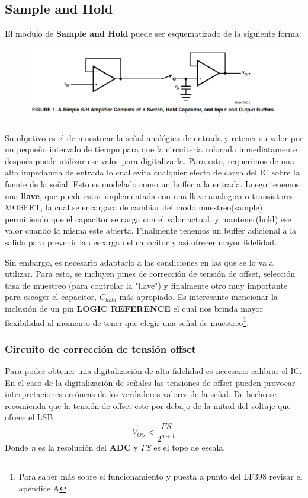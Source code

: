 


\subsection{Sample and Hold}

El modulo de \textbf{Sample and Hold}  puede ser esquematizado de la siguiente forma:

\begin{figure}[H]
	\centering
	\includegraphics[width=0.7\linewidth]{ImagenesEjercicio4/SyH}
	\caption{}
	\label{fig:syh}
\end{figure}
Su objetivo es el de muestrear la señal analógica de entrada y retener su valor por un pequeño intervalo de tiempo para que la circuiteria colocada inmediatamente después puede utilizar ese valor para digitalizarla.
Para esto, requerimos de una alta impedancia de entrada lo cual evita cualquier efecto de carga del IC sobre la fuente de la señal. Esto es modelado como un buffer a la entrada. Luego tenemos una \textbf{llave}, que puede estar implementada con una llave analogica o transistores MOSFET, la cual se encargara de cambiar del modo muestreo(sample) permitiendo que el capacitor se carga con el valor actual, y mantener(hold) ese valor cuando la misma este abierta. Finalmente tenemos un buffer adicional a la salida para prevenir la descarga del capacitor y así ofrecer mayor fidelidad. 


 Sin embargo, es necesario adaptarlo a las condiciones en las que se lo va a utilizar. Para esto, se incluyen pines de corrección de tensión de offset, selección tasa de muestreo (para controlar la "llave") y finalmente otro muy importante para escoger el capacitor, $C_{hold}$ más apropiado.
 Es interesante mencionar la inclusión de un pin \textbf{LOGIC REFERENCE} el cual nos brinda mayor flexibilidad al momento de tener que elegir una señal de muestreo\footnote{Para saber más sobre el funcionamiento y puesta a punto del LF398 revisar el apéndice A}.
 \subsubsection{Circuito de corrección de tensión offset}
 Para poder obtener una digitalización de alta fidelidad es necesario calibrar el IC. En el caso de la digitalización de señales las tensiones de offset pueden provocar interpretaciones erróneas de los verdaderos valores de la señal. De hecho se recomienda que la tensión de offset este por debajo de la mitad del voltaje que ofrece el LSB.
 $$
 V_{OS} < \frac{FS}{2^{n+1}} 
 $$
Donde \textit{n }es la resolución del \textbf{ADC}
y \textit{FS} es el tope de escala.

